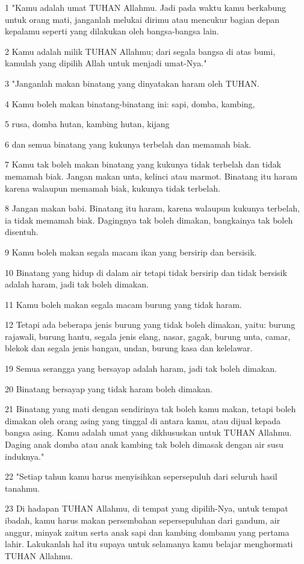 \par 1 "Kamu adalah umat TUHAN Allahmu. Jadi pada waktu kamu berkabung untuk orang mati, janganlah melukai dirimu atau mencukur bagian depan kepalamu seperti yang dilakukan oleh bangsa-bangsa lain.
\par 2 Kamu adalah milik TUHAN Allahmu; dari segala bangsa di atas bumi, kamulah yang dipilih Allah untuk menjadi umat-Nya."
\par 3 "Janganlah makan binatang yang dinyatakan haram oleh TUHAN.
\par 4 Kamu boleh makan binatang-binatang ini: sapi, domba, kambing,
\par 5 rusa, domba hutan, kambing hutan, kijang
\par 6 dan semua binatang yang kukunya terbelah dan memamah biak.
\par 7 Kamu tak boleh makan binatang yang kukunya tidak terbelah dan tidak memamah biak. Jangan makan unta, kelinci atau marmot. Binatang itu haram karena walaupun memamah biak, kukunya tidak terbelah.
\par 8 Jangan makan babi. Binatang itu haram, karena walaupun kukunya terbelah, ia tidak memamah biak. Dagingnya tak boleh dimakan, bangkainya tak boleh disentuh.
\par 9 Kamu boleh makan segala macam ikan yang bersirip dan bersisik.
\par 10 Binatang yang hidup di dalam air tetapi tidak bersirip dan tidak bersisik adalah haram, jadi tak boleh dimakan.
\par 11 Kamu boleh makan segala macam burung yang tidak haram.
\par 12 Tetapi ada beberapa jenis burung yang tidak boleh dimakan, yaitu: burung rajawali, burung hantu, segala jenis elang, nasar, gagak, burung unta, camar, blekok dan segala jenis bangau, undan, burung kasa dan kelelawar.
\par 19 Semua serangga yang bersayap adalah haram, jadi tak boleh dimakan.
\par 20 Binatang bersayap yang tidak haram boleh dimakan.
\par 21 Binatang yang mati dengan sendirinya tak boleh kamu makan, tetapi boleh dimakan oleh orang asing yang tinggal di antara kamu, atau dijual kepada bangsa asing. Kamu adalah umat yang dikhususkan untuk TUHAN Allahmu. Daging anak domba atau anak kambing tak boleh dimasak dengan air susu induknya."
\par 22 "Setiap tahun kamu harus menyisihkan sepersepuluh dari seluruh hasil tanahmu.
\par 23 Di hadapan TUHAN Allahmu, di tempat yang dipilih-Nya, untuk tempat ibadah, kamu harus makan persembahan sepersepuluhan dari gandum, air anggur, minyak zaitun serta anak sapi dan kambing dombamu yang pertama lahir. Lakukanlah hal itu supaya untuk selamanya kamu belajar menghormati TUHAN Allahmu.
